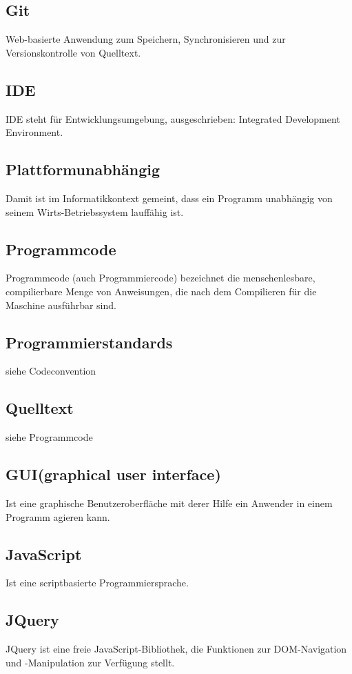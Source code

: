 \documentclass[11pt,a4paper]{article}
\begin{document}
\subsection{Git}
Web-basierte Anwendung zum Speichern, Synchronisieren und zur Versionskontrolle von Quelltext.

\subsection{IDE} 
IDE steht für Entwicklungsumgebung, ausgeschrieben: Integrated Development Environment.

\subsection{Plattformunabhängig} Damit ist im Informatikkontext gemeint, dass ein Programm unabhängig von seinem Wirts-Betriebssystem lauffähig ist.

\subsection{Programmcode} Programmcode (auch Programmiercode) bezeichnet die menschenlesbare, compilierbare Menge von Anweisungen, die nach dem Compilieren für die Maschine ausführbar sind.

\subsection{Programmierstandards}
siehe Codeconvention

\subsection{Quelltext}
siehe Programmcode

\subsection{GUI(graphical user interface)} Ist eine graphische Benutzeroberfläche mit derer Hilfe ein Anwender in einem Programm agieren kann.

\subsection{JavaScript} Ist eine scriptbasierte Programmiersprache.

\subsection{JQuery}
JQuery ist eine freie JavaScript-Bibliothek, die Funktionen zur DOM-Navigation und -Manipulation zur Verfügung stellt.
\end{document}
